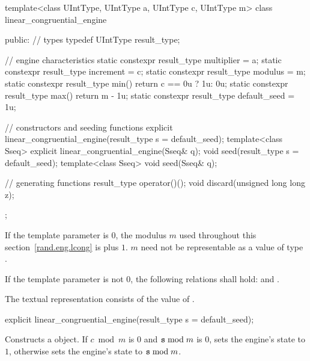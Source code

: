 \begin{codeblock}
template<class UIntType, UIntType a, UIntType c, UIntType m>
 class linear_congruential_engine
{
public:
 // types
 typedef UIntType result_type;

 // engine characteristics
 static constexpr result_type multiplier = a;
 static constexpr result_type increment = c;
 static constexpr result_type modulus = m;
 static constexpr result_type min() { return c == 0u ? 1u: 0u; }
 static constexpr result_type max() { return m - 1u; }
 static constexpr result_type default_seed = 1u;

 // constructors and seeding functions
 explicit linear_congruential_engine(result_type s = default_seed);
 template<class Sseq> explicit linear_congruential_engine(Sseq& q);
 void seed(result_type s = default_seed);
 template<class Sseq> void seed(Sseq& q);

 // generating functions
 result_type operator()();
 void discard(unsigned long long z);
};
\end{codeblock}

\pnum
If the template parameter
 is $0$,
the modulus $m$
used throughout this section~\ref{rand.eng.lcong}
is  plus $1$.
\enternote
 $m$ need not be representable
 as a value of type .
\exitnote

\pnum
If the template parameter
 is not $0$,
the following relations shall hold:
and
  .

\pnum The textual representation%
consists of
the value of .

%

\begin{itemdecl}
explicit linear_congruential_engine(result_type s = default_seed);
\end{itemdecl}

\begin{itemdescr}
\pnum\effects Constructs a  object.
 If $ c \bmod m $ is $0$ and $ \texttt{s} \bmod m $ is $0$,
 sets the engine's state to $1$,
 otherwise sets the engine's state to $\texttt{s} \bmod m$.
\end{itemdescr}

%

